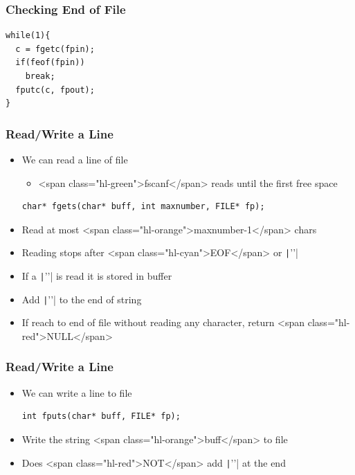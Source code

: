 \documentclass{../c-lecture}
\begin{document}
\begin{frame}[fragile]
  \frametitle{Checking End of File}
  \begin{verbatim}
while(1){
  c = fgetc(fpin);
  if(feof(fpin))
    break;
  fputc(c, fpout);
}
  \end{verbatim}
\end{frame}
\begin{frame}[fragile]
  \frametitle{Read/Write a Line}
  \begin{itemize}
    \item We can read a line of file
    \begin{itemize}
      \item
        <span class="hl-green">fscanf</span> reads until the first free space

    \end{itemize}
    \begin{verbatim}
char* fgets(char* buff, int maxnumber, FILE* fp);
    \end{verbatim}
    \item Read at most <span class="hl-orange">maxnumber-1</span> chars
    \item
      Reading stops after <span class="hl-cyan">EOF</span> or
      \texttt|'\n'|

    \item If a \texttt|'\n'| is read it is stored in buffer
    \item Add \texttt|'\0'| to the end of string
    \item
      If reach to end of file without reading any character, return
      <span class="hl-red">NULL</span>

  \end{itemize}
\end{frame}

\begin{frame}[fragile]
  \frametitle{Read/Write a Line}
  \begin{itemize}
    \item We can write a line to file
    \begin{verbatim}
int fputs(char* buff, FILE* fp);
    \end{verbatim}
    \item Write the string <span class="hl-orange">buff</span> to file
    \item Does <span class="hl-red">NOT</span> add \texttt|'\n'| at the end
  \end{itemize}
\end{frame}
\end{document}
